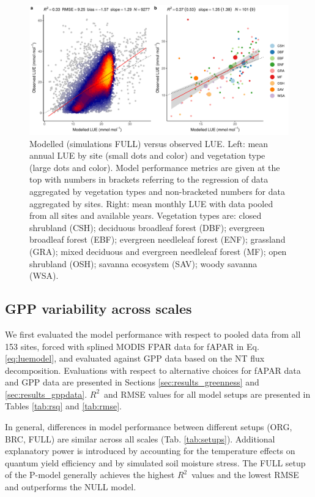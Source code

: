 \documentclass[gmd, manuscript]{copernicus}
\newcommand{\rsq}{$R^2$}
\begin{document}
 \begin{figure}[t]
\includegraphics[width=12cm]{fig/modobs_lue.pdf}
    \caption{Modelled (simulations FULL) versus observed LUE. Left: mean annual LUE by site (small dots and color) and vegetation type (large dots and color). Model performance metrics are given at the top with numbers in brackets referring to the regression of data aggregated by vegetation types and non-bracketed numbers for data aggregated by sites. Right: mean monthly LUE with data pooled from all sites and available years. Vegetation types are: closed shrubland (CSH); deciduous broadleaf forest (DBF); evergreen broadleaf forest (EBF); evergreen needleleaf forest (ENF); grassland (GRA); mixed deciduous and evergreen needleleaf forest (MF); open shrubland (OSH); savanna ecosystem (SAV); woody savanna (WSA). }
    \label{fig:lue}
\end{figure}


\subsection{GPP variability across scales}

We first evaluated the model performance with respect to pooled data from all 153 sites, forced with splined MODIS FPAR data for fAPAR in Eq. \ref{eq:luemodel}, and evaluated against GPP data based on the NT flux decomposition. Evaluations with respect to alternative choices for fAPAR data and GPP data are presented in Sections \ref{sec:results_greenness} and \ref{sec:results_gppdata}. \rsq\ and RMSE values for all model setups are presented in Tables \ref{tab:rsq} and \ref{tab:rmse}.

In general, differences in model performance between different setups  (ORG, BRC, FULL) are similar across all scales (Tab. \ref{tab:setups}). Additional explanatory power is introduced by accounting for the temperature effects on quantum yield efficiency and by simulated soil moisture stress. The FULL setup of the P-model generally achieves the highest \rsq\ values and the lowest RMSE and outperforms the NULL model.
\end{document}
